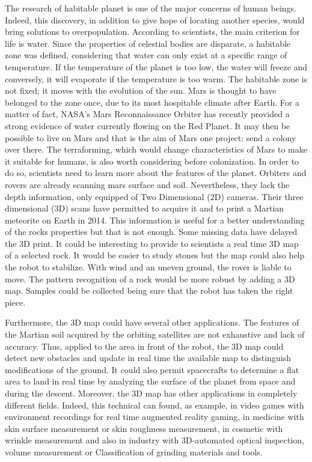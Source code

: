 The research of habitable planet is one of the major concerns of human beings. Indeed, this discovery, in addition to give hope of locating another species, would bring solutions to overpopulation. According to scientists, the main criterion for life is water. Since the properties of celestial bodies are disparate, a habitable zone was defined, considering that water can only exist at a specific range of temperature. If the temperature of the planet is too low, the water will freeze and conversely, it will evaporate if the temperature is too warm. The habitable zone is not fixed; it moves with the evolution of the sun. Mars is thought to have belonged to the zone once, due to its most hospitable climate after Earth. For a matter of fact, NASA's Mars Reconnaissance Orbiter has recently provided a strong evidence of water currently flowing on the Red Planet. It may then be possible to live on Mars and that is the aim of Mars one project: send a colony over there. The terraforming, which would change characteristics of Mars to make it suitable for humans, is also worth considering before colonization. In order to do so, scientists need to learn more about the features of the planet. Orbiters and rovers are already scanning mars surface and soil. Nevertheless, they lack the depth information, only equipped of Two Dimensional (2D) cameras. Their three dimensional (3D) scans have permitted to acquire it and to print a Martian meteorite on Earth in 2014. This information is useful for a better understanding of the rocks properties but that is not enough. Some missing data have delayed the 3D print. It could be interesting to provide to scientists a real time 3D map of a selected rock. It would be easier to study stones but the map could also help the robot to stabilize. With wind and an uneven ground, the rover is liable to move. The pattern recognition of a rock would be more robust by adding a 3D map. Samples could be collected being sure that the robot has taken the right piece. 

Furthermore, the 3D map could have several other applications. The features of the Martian soil acquired by the orbiting satellites are not exhaustive and lack of accuracy. Thus, applied to the area in front of the robot, the 3D map could detect new obstacles and update in real time the available map to distinguish modifications of the ground. It could also permit spacecrafts to determine a flat area to land in real time by analyzing the surface of the planet from space and during the descent. Moreover, the 3D map has other applications in completely different fields. Indeed, this technical can found, as example, in video games with environment recordings for real time augmented reality gaming, in medicine with skin surface measurement or skin roughness measurement, in cosmetic with wrinkle measurement and also in industry with 3D-automated optical inspection, volume measurement or Classification of grinding materials and tools.

